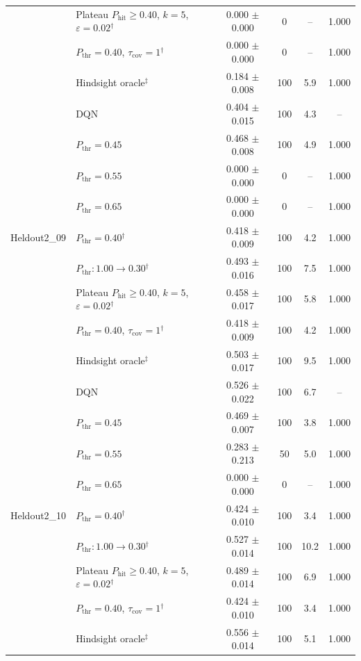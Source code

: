 \begin{table}[htbp]
\begin{tabular}{llcccc}
 & Plateau $P_{\mathrm{hit}}\geq0.40$, $k=5$, $\varepsilon=0.02$$^{\dagger}$ & 0.000 $\pm$ 0.000 & 0 & -- & 1.000 \\
 & $P_{\mathrm{thr}}=0.40$, $\tau_{\mathrm{cov}}=1$$^{\dagger}$ & 0.000 $\pm$ 0.000 & 0 & -- & 1.000 \\
 & Hindsight oracle$^{\ddagger}$ & 0.184 $\pm$ 0.008 & 100 & 5.9 & 1.000 \\
\midrule
\multirow{9}{*}{Heldout2\_09} & DQN & 0.404 $\pm$ 0.015 & 100 & 4.3 & -- \\
 & $P_{\mathrm{thr}}=0.45$ & 0.468 $\pm$ 0.008 & 100 & 4.9 & 1.000 \\
 & $P_{\mathrm{thr}}=0.55$ & 0.000 $\pm$ 0.000 & 0 & -- & 1.000 \\
 & $P_{\mathrm{thr}}=0.65$ & 0.000 $\pm$ 0.000 & 0 & -- & 1.000 \\
 & $P_{\mathrm{thr}}=0.40$$^{\dagger}$ & 0.418 $\pm$ 0.009 & 100 & 4.2 & 1.000 \\
 & $P_{\mathrm{thr}}: 1.00 \to 0.30$$^{\dagger}$ & 0.493 $\pm$ 0.016 & 100 & 7.5 & 1.000 \\
 & Plateau $P_{\mathrm{hit}}\geq0.40$, $k=5$, $\varepsilon=0.02$$^{\dagger}$ & 0.458 $\pm$ 0.017 & 100 & 5.8 & 1.000 \\
 & $P_{\mathrm{thr}}=0.40$, $\tau_{\mathrm{cov}}=1$$^{\dagger}$ & 0.418 $\pm$ 0.009 & 100 & 4.2 & 1.000 \\
 & Hindsight oracle$^{\ddagger}$ & 0.503 $\pm$ 0.017 & 100 & 9.5 & 1.000 \\
\midrule
\multirow{9}{*}{Heldout2\_10} & DQN & 0.526 $\pm$ 0.022 & 100 & 6.7 & -- \\
 & $P_{\mathrm{thr}}=0.45$ & 0.469 $\pm$ 0.007 & 100 & 3.8 & 1.000 \\
 & $P_{\mathrm{thr}}=0.55$ & 0.283 $\pm$ 0.213 & 50 & 5.0 & 1.000 \\
 & $P_{\mathrm{thr}}=0.65$ & 0.000 $\pm$ 0.000 & 0 & -- & 1.000 \\
 & $P_{\mathrm{thr}}=0.40$$^{\dagger}$ & 0.424 $\pm$ 0.010 & 100 & 3.4 & 1.000 \\
 & $P_{\mathrm{thr}}: 1.00 \to 0.30$$^{\dagger}$ & 0.527 $\pm$ 0.014 & 100 & 10.2 & 1.000 \\
 & Plateau $P_{\mathrm{hit}}\geq0.40$, $k=5$, $\varepsilon=0.02$$^{\dagger}$ & 0.489 $\pm$ 0.014 & 100 & 6.9 & 1.000 \\
 & $P_{\mathrm{thr}}=0.40$, $\tau_{\mathrm{cov}}=1$$^{\dagger}$ & 0.424 $\pm$ 0.010 & 100 & 3.4 & 1.000 \\
 & Hindsight oracle$^{\ddagger}$ & 0.556 $\pm$ 0.014 & 100 & 5.1 & 1.000 \\

\end{tabular}
\end{table}

